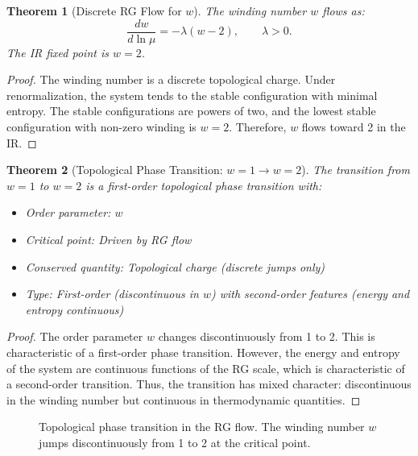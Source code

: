 \documentclass[12pt,oneside]{book}
\newtheorem{theorem}{Theorem}[chapter]
\begin{document}
\begin{theorem}[Discrete RG Flow for $w$]
The winding number $w$ flows as:
\[
\frac{dw}{d\ln\mu} = -\lambda(w - 2), \qquad \lambda > 0.
\]
The IR fixed point is $w = 2$.
\end{theorem}

\begin{proof}
The winding number is a discrete topological charge. Under renormalization, the system tends to the stable configuration with minimal entropy. The stable configurations are powers of two, and the lowest stable configuration with non-zero winding is $w = 2$. Therefore, $w$ flows toward 2 in the IR.
\end{proof}

\begin{theorem}[Topological Phase Transition: $w = 1 \to w = 2$]
The transition from $w = 1$ to $w = 2$ is a first-order topological phase transition with:
\begin{itemize}
    \item Order parameter: $w$
    \item Critical point: Driven by RG flow
    \item Conserved quantity: Topological charge (discrete jumps only)
    \item Type: First-order (discontinuous in $w$) with second-order features (energy and entropy continuous)
\end{itemize}
\end{theorem}

\begin{proof}
The order parameter $w$ changes discontinuously from 1 to 2. This is characteristic of a first-order phase transition. However, the energy and entropy of the system are continuous functions of the RG scale, which is characteristic of a second-order transition. Thus, the transition has mixed character: discontinuous in the winding number but continuous in thermodynamic quantities.
\end{proof}

\begin{figure}[H]
\centering
{}
\caption{Topological phase transition in the RG flow. The winding number $w$ jumps discontinuously from 1 to 2 at the critical point.}
\label{fig:phase_transition}
\end{figure}
\end{document}
